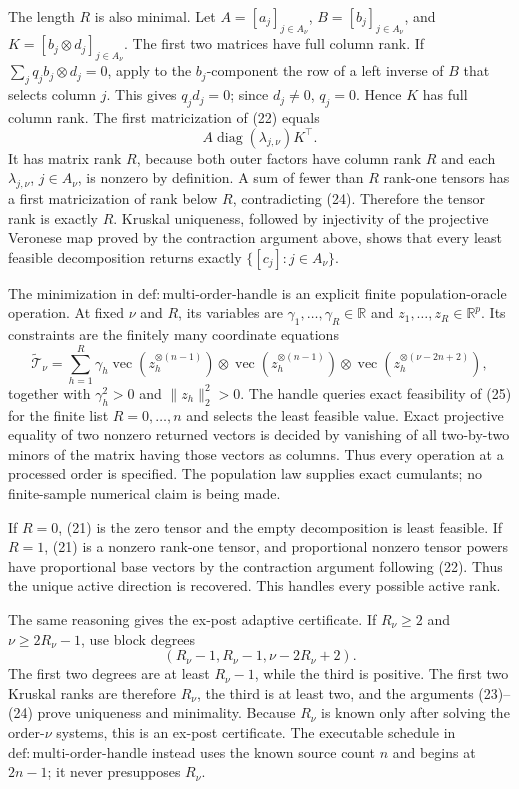 The length \(R\) is also minimal. Let \(A=[a_j]_{j\in A_\nu}\), \(B=[b_j]_{j\in A_\nu}\), and \(K=[b_j\otimes d_j]_{j\in A_\nu}\). The first two matrices have full column rank. If \(\sum_j q_jb_j\otimes d_j=0\), apply to the \(b_j\)-component the row of a left inverse of \(B\) that selects column \(j\). This gives \(q_jd_j=0\); since \(d_j\ne0\), \(q_j=0\). Hence \(K\) has full column rank. The first matricization of (22) equals
\[
 A\operatorname{diag}(\lambda_{j,\nu})K^\top. \tag{24}
\]
It has matrix rank \(R\), because both outer factors have column rank \(R\) and each \(\lambda_{j,\nu}\), \(j\in A_\nu\), is nonzero by definition. A sum of fewer than \(R\) rank-one tensors has a first matricization of rank below \(R\), contradicting (24). Therefore the tensor rank is exactly \(R\). Kruskal uniqueness, followed by injectivity of the projective Veronese map proved by the contraction argument above, shows that every least feasible decomposition returns exactly \(\{[c_j]:j\in A_\nu\}\).

The minimization in \(\mathrm{def:multi\text{-}order\text{-}handle}\) is an explicit finite population-oracle operation. At fixed \(\nu\) and \(R\), its variables are \(\gamma_1,\ldots,\gamma_R\in\mathbb R\) and \(z_1,\ldots,z_R\in\mathbb R^p\). Its constraints are the finitely many coordinate equations
\[
 \widetilde{\mathcal T}_\nu
 =\sum_{h=1}^{R}\gamma_h
 \operatorname{vec}(z_h^{\otimes(n-1)})\otimes
 \operatorname{vec}(z_h^{\otimes(n-1)})\otimes
 \operatorname{vec}(z_h^{\otimes(\nu-2n+2)}), \tag{25}
\]
together with \(\gamma_h^2>0\) and \(\lVert z_h\rVert_2^2>0\). The handle queries exact feasibility of (25) for the finite list \(R=0,\ldots,n\) and selects the least feasible value. Exact projective equality of two nonzero returned vectors is decided by vanishing of all two-by-two minors of the matrix having those vectors as columns. Thus every operation at a processed order is specified. The population law supplies exact cumulants; no finite-sample numerical claim is being made.

If \(R=0\), (21) is the zero tensor and the empty decomposition is least feasible. If \(R=1\), (21) is a nonzero rank-one tensor, and proportional nonzero tensor powers have proportional base vectors by the contraction argument following (22). Thus the unique active direction is recovered. This handles every possible active rank.

The same reasoning gives the ex-post adaptive certificate. If \(R_\nu\ge2\) and \(\nu\ge2R_\nu-1\), use block degrees
\[
 (R_\nu-1,R_\nu-1,\nu-2R_\nu+2). \tag{26}
\]
The first two degrees are at least \(R_\nu-1\), while the third is positive. The first two Kruskal ranks are therefore \(R_\nu\), the third is at least two, and the arguments (23)--(24) prove uniqueness and minimality. Because \(R_\nu\) is known only after solving the order-\(\nu\) systems, this is an ex-post certificate. The executable schedule in \(\mathrm{def:multi\text{-}order\text{-}handle}\) instead uses the known source count \(n\) and begins at \(2n-1\); it never presupposes \(R_\nu\).

